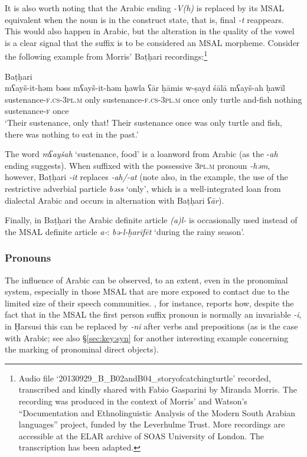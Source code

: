 \documentclass[output=paper]{langsci/langscibook}
\begin{document}
It is also worth noting that the Arabic ending \textit{-V(h)} is replaced by its MSAL equivalent when the noun is in the construct state, that is, final \textit{-t} reappears. This would also happen in Arabic, but the alteration in the quality of the vowel is a clear signal that the suffix is to be considered an MSAL morpheme. Consider the following example from Morris’ Baṭḥari recordings:\footnote{Audio 
  file ‘20130929\_B\_B02andB04\_storyofcatchingturtle’ recorded, transcribed and kindly shared with Fabio Gasparini by Miranda Morris. The recording was produced in the context of Morris’ and Watson’s “Documentation and Ethnolinguistic Analysis of the Modern South Arabian languages” project, funded by the Leverhulme Trust. More recordings are accessible at the ELAR archive of SOAS University of London. The transcription has been adapted.
  }

\ea
Baṭḥari\\
\gll mʕayš-it-həm bəss mʕayš-it-həm ḥawla ʕār ḥāmis w-ṣayd śālā mʕayš-ah ḥawīl\\
     sustenance-\textsc{f.cs-3pl.m} only sustenance-\textsc{f.cs-3pl.m} once only turtle and-fish nothing sustenance-\textsc{f} once\\
\glt `Their sustenance, only that! Their sustenance once was only turtle and fish, there was nothing to eat in the past.'
\z
 

The word \textit{mʕayšah} ‘sustenance, food’ is a loanword from Arabic (as the -\textit{ah} ending suggests). When suffixed with the possessive \textsc{3pl.m} pronoun \textit{-həm}, however, Baṭḥari \textit{-it} replaces \textit{-ah/-at} (note also, in the example, the use of the restrictive adverbial particle \textit{bəss} ‘only’, which is a well-integrated loan from dialectal Arabic and occurs in alternation with Baṭḥari \textit{ʕār}). 

Finally, in Baṭḥari the Arabic definite article \textit{(a)l-} is occasionally used instead of the MSAL definite article \textit{a-}:  \textit{bə-l-ḫarifēt} ‘during the rainy season'.


 \subsubsection{Pronouns}\label{sec:key:pro}

The influence of Arabic can be observed, to an extent, even in the pronominal system, especially in those MSAL that are more exposed to contact due to the limited size of their speech communities. \citet{Lonnet2011}, for instance, reports how, despite the fact that in the MSAL the first person suffix pronoun is normally an invariable \textit{-i}, in Ḥarsusi this can be replaced by \textit{-ni} after verbs and prepositions (as is the case with Arabic; see also §\ref{sec:key:syn} for another interesting example concerning the marking of pronominal direct objects).
\end{document}

